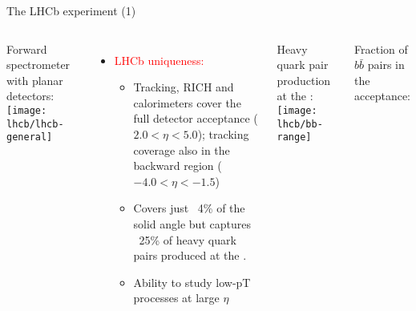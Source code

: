 \begin{frame}[t]{The LHCb experiment (1)}
\small
\centering
\begin{columns}[t]
Forward spectrometer with planar detectors:
\texttt{[image: lhcb/lhcb-general]}

\begin{itemize}
\item \textcolor{red}{LHCb uniqueness:}
\begin{itemize}
\footnotesize
\item Tracking, RICH and calorimeters cover
the full detector acceptance ($2.0< \eta <5.0$);
tracking coverage also in the backward
region ($-4.0 < \eta <-1.5$)
\item Covers just ~4\% of the solid angle but captures
~25\% of heavy quark pairs produced at the \lhc.
\item Ability to study low-pT processes at large $\eta$
\end{itemize}
\end{itemize}

Heavy quark pair production at the \lhc:
\texttt{[image: lhcb/bb-range]}

Fraction of $b\bar{b}$ pairs in the acceptance:
\end{columns}

\end{frame}